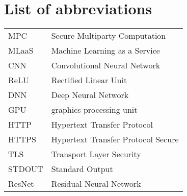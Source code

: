 \chapter*{List of abbreviations}
\begin{table}[!h]
	\begin{tabular}{ll}
		MPC			&	Secure Multiparty Computation\\
		MLaaS		&	Machine Learning as a Service\\
		CNN			&	Convolutional Neural Network\\
		ReLU		&	Rectified Linear Unit\\
		DNN 		&	Deep Neural Network\\
		GPU 		&	graphics processing unit\\
		HTTP		&	Hypertext Transfer Protocol\\
		HTTPS		&	Hypertext Transfer Protocol Secure\\
		TLS			&	Transport Layer Security\\
		STDOUT	&	Standard Output\\
		ResNet	&	Residual Neural Network\\
	\end{tabular}
\end{table}

